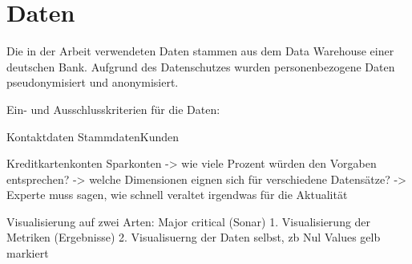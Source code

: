 \chapter{Daten}\label{ch:data}

Die in der Arbeit verwendeten Daten stammen aus dem Data Warehouse einer deutschen Bank.
Aufgrund des Datenschutzes wurden personenbezogene Daten pseudonymisiert und anonymisiert.

Ein- und Ausschlusskriterien für die Daten:


Kontaktdaten
StammdatenKunden


Kreditkartenkonten
Sparkonten
-> wie viele Prozent würden den Vorgaben entsprechen? 
-> welche Dimensionen eignen sich für verschiedene Datensätze?
-> Experte muss sagen, wie schnell veraltet irgendwas für die Aktualität

Visualisierung auf zwei Arten: Major critical (Sonar)
1. Visualisierung der Metriken (Ergebnisse)
2. Visualisuerng der Daten selbst, zb Nul Values gelb markiert
